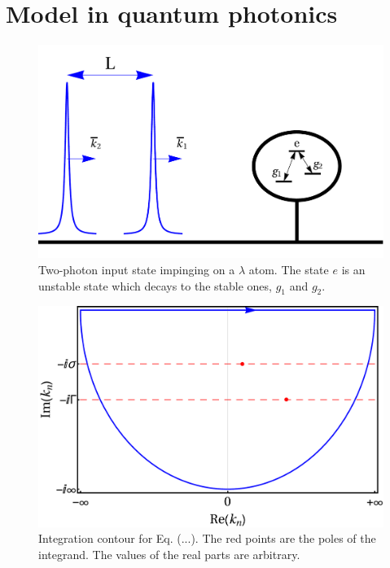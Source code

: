 \documentclass[aps,pra,reprint,amsmath,amssymb]{revtex4-1}
\begin{document}
\section{Model in quantum photonics} 
\begin{figure}
\includegraphics[scale=0.25]{input.pdf}
\caption{Two-photon input state impinging on a $\lambda$ atom. The state $e$ is an unstable state which decays to the stable ones, $g_1$ and $g_2$.}
\end{figure}

\appendix

\begin{figure}
\includegraphics[scale=0.25]{lower_contour.pdf}
\caption{Integration contour for Eq. (...). The red points are the poles of the
integrand. The values of the real parts are arbitrary.}
\end{figure}
\end{document}
